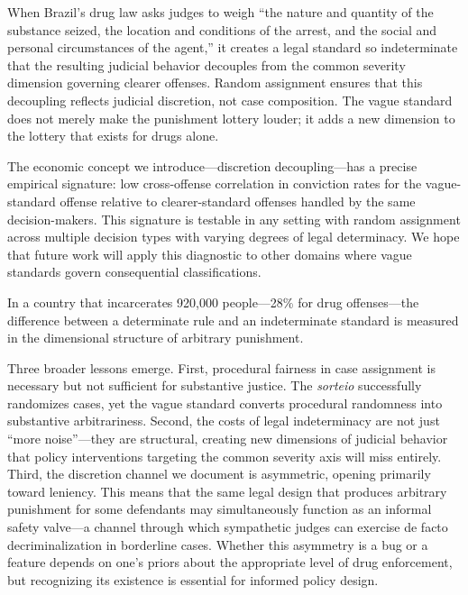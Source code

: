 \documentclass[12pt]{article}
\begin{document}
When Brazil's drug law asks judges to weigh ``the nature and quantity of the substance seized, the location and conditions of the arrest, and the social and personal circumstances of the agent,'' it creates a legal standard so indeterminate that the resulting judicial behavior decouples from the common severity dimension governing clearer offenses. Random assignment ensures that this decoupling reflects judicial discretion, not case composition. The vague standard does not merely make the punishment lottery louder; it adds a new dimension to the lottery that exists for drugs alone.

The economic concept we introduce---discretion decoupling---has a precise empirical signature: low cross-offense correlation in conviction rates for the vague-standard offense relative to clearer-standard offenses handled by the same decision-makers. This signature is testable in any setting with random assignment across multiple decision types with varying degrees of legal determinacy. We hope that future work will apply this diagnostic to other domains where vague standards govern consequential classifications.

In a country that incarcerates 920,000 people---28\% for drug offenses---the difference between a determinate rule and an indeterminate standard is measured in the dimensional structure of arbitrary punishment.

\vspace{1em}

Three broader lessons emerge. First, procedural fairness in case assignment is necessary but not sufficient for substantive justice. The \textit{sorteio} successfully randomizes cases, yet the vague standard converts procedural randomness into substantive arbitrariness. Second, the costs of legal indeterminacy are not just ``more noise''---they are structural, creating new dimensions of judicial behavior that policy interventions targeting the common severity axis will miss entirely. Third, the discretion channel we document is asymmetric, opening primarily toward leniency. This means that the same legal design that produces arbitrary punishment for some defendants may simultaneously function as an informal safety valve---a channel through which sympathetic judges can exercise de facto decriminalization in borderline cases. Whether this asymmetry is a bug or a feature depends on one's priors about the appropriate level of drug enforcement, but recognizing its existence is essential for informed policy design.
\end{document}
